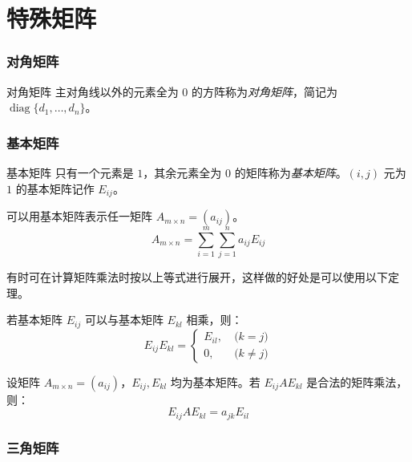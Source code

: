 
\section{特殊矩阵}

\subsubsection{对角矩阵}

\begin{definition}{对角矩阵}
	主对角线以外的元素全为 $0$ 的方阵称为\emph{对角矩阵}，简记为 $\operatorname{diag} \{d_1, \ldots, d_n\}$。
\end{definition}

\subsubsection{基本矩阵}

\begin{definition}{基本矩阵}
	只有一个元素是 $1$，其余元素全为 $0$ 的矩阵称为\emph{基本矩阵}。$(i, j)$ 元为 $1$ 的基本矩阵记作 $E_{ij}$。
\end{definition}

可以用基本矩阵表示任一矩阵 $A_{m \times n} = (a_{ij})$。
$$
A_{m \times n} = \sum\limits_{i = 1}^{m} \sum\limits_{j = 1}^n a_{ij} E_{ij}
$$

有时可在计算矩阵乘法时按以上等式进行展开，这样做的好处是可以使用以下定理。

\begin{theorem}
	若基本矩阵 $E_{ij}$ 可以与基本矩阵 $E_{kl}$ 相乘，则：
	$$
	E_{ij} E_{kl} =
	\begin{cases}
		E_{il}, & \pod{k = j}
		\\
		0, & \pod{k \ne j}
	\end{cases}
	$$
\end{theorem}

\begin{theorem}
	设矩阵 $A_{m \times n} = (a_{ij})$，$E_{ij}, E_{kl}$ 均为基本矩阵。若 $E_{ij} A E_{kl}$ 是合法的矩阵乘法，则：
	$$
	E_{ij} A E_{kl} = a_{jk} E_{il}
	$$
\end{theorem}

\subsubsection{三角矩阵}

